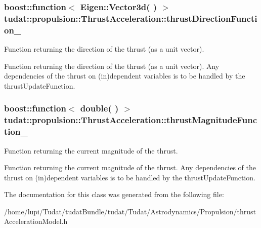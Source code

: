 \subsubsection[{\texorpdfstring{thrust\+Direction\+Function\+\_\+}{thrustDirectionFunction_}}]{\setlength{\rightskip}{0pt plus 5cm}boost\+::function$<$ Eigen\+::\+Vector3d( ) $>$ tudat\+::propulsion\+::\+Thrust\+Acceleration\+::thrust\+Direction\+Function\+\_\+\hspace{0.3cm}{\ttfamily [protected]}}\hypertarget{classtudat_1_1propulsion_1_1ThrustAcceleration_addab21b2c71cc5aa71268590d076a653}{}\label{classtudat_1_1propulsion_1_1ThrustAcceleration_addab21b2c71cc5aa71268590d076a653}


Function returning the direction of the thrust (as a unit vector). 

Function returning the direction of the thrust (as a unit vector). Any dependencies of the thrust on (in)dependent variables is to be handled by the thrust\+Update\+Function. 
\subsubsection[{\texorpdfstring{thrust\+Magnitude\+Function\+\_\+}{thrustMagnitudeFunction_}}]{\setlength{\rightskip}{0pt plus 5cm}boost\+::function$<$ double( ) $>$ tudat\+::propulsion\+::\+Thrust\+Acceleration\+::thrust\+Magnitude\+Function\+\_\+\hspace{0.3cm}{\ttfamily [protected]}}\hypertarget{classtudat_1_1propulsion_1_1ThrustAcceleration_aadcc088dd4a38db8b8f67ed0853dcc29}{}\label{classtudat_1_1propulsion_1_1ThrustAcceleration_aadcc088dd4a38db8b8f67ed0853dcc29}


Function returning the current magnitude of the thrust. 

Function returning the current magnitude of the thrust. Any dependencies of the thrust on (in)dependent variables is to be handled by the thrust\+Update\+Function. 

The documentation for this class was generated from the following file\+:\begin{DoxyCompactItemize}
\item 
/home/lupi/\+Tudat/tudat\+Bundle/tudat/\+Tudat/\+Astrodynamics/\+Propulsion/thrust\+Acceleration\+Model.\+h\end{DoxyCompactItemize}
